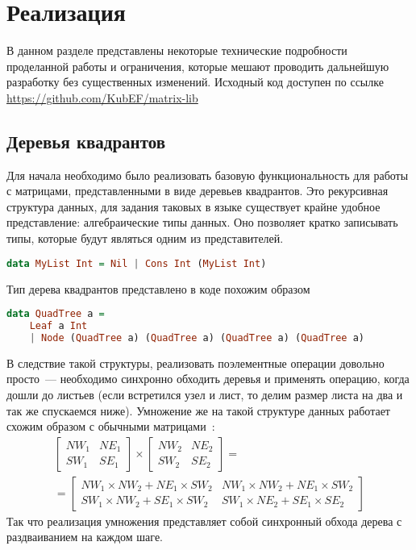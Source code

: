 
\section{Реализация}
В данном разделе представлены некоторые технические подробности проделанной работы и ограничения, которые мешают проводить дальнейшую разработку без существенных изменений. Исходный код доступен по ссылке \url{https://github.com/KubEF/matrix-lib}
\subsection{Деревья квадрантов}
Для начала необходимо было реализовать базовую функциональность для работы с матрицами, представленными в виде деревьев квадрантов. Это рекурсивная структура данных, для задания таковых в языке \Haskell{} существует крайне удобное представление: алгебраические типы данных. Оно позволяет кратко записывать типы, которые будут являться одним из представителей.
\begin{lstlisting}[caption={пример конструирования односвязного списка над целыми числами}, language=Haskell, frame=single]
    data MyList Int = Nil | Cons Int (MyList Int)
\end{lstlisting}
Тип дерева квадрантов представлено в коде похожим образом
\begin{lstlisting}[caption={задание типа дерева квадрантов в библоитеке}, language=Haskell, frame=single, basicstyle=\ttfamily]
data QuadTree a =
    Leaf a Int
    | Node (QuadTree a) (QuadTree a) (QuadTree a) (QuadTree a)
\end{lstlisting}
В следствие такой структуры, реализовать поэлементные операции довольно просто~--- необходимо синхронно обходить деревья и применять операцию, когда дошли до листьев (если встретился узел и лист, то делим размер листа на два и так же спускаемся ниже). Умножение же на такой структуре данных работает схожим образом с обычными матрицами~\cite{10.1007/3-540-51084-2_9}:
\begin{gather*}
    \begin{bmatrix}
        NW_1 & NE_1 \\
        SW_1 & SE_1
    \end{bmatrix}
    \times
    \begin{bmatrix}
        NW_2 & NE_2 \\
        SW_2 & SE_2
    \end{bmatrix} = \\ =
    \begin{bmatrix}
        NW_1 \times NW_2 + NE_1 \times SW_2 & NW_1 \times NW_2 + NE_1 \times SW_2  \\
        SW_1 \times NW_2 + SE_1 \times SW_2 & SW_1 \times NE_2 + SE_1 \times SE_2
    \end{bmatrix}
\end{gather*}
Так что реализация умножения представляет собой синхронный обхода дерева с раздваиванием на каждом шаге.
